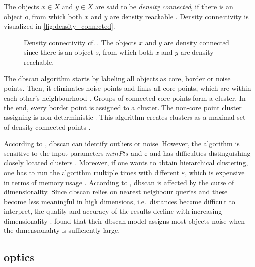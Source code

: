 The objects $x \in X$ and $y \in X$ are said to be \textit{density connected}, if there is an object $o$, from which both $x$ and $y$ are density reachable \cite{OPTICS_kMeans_2016}.
Density connectivity is visualized in \autoref{fig:density_connected}.

\begin{figure}[!htp] %
    \centering
    
    \caption[Density connectivity]{Density connectivity cf. \cite{OPTICS1999}.
    The objects $x$ and $y$ are density connected since there is an object $o$, from which both $x$ and $y$ are density reachable.
    }
    \label{fig:density_connected}
\end{figure}

The \ac{dbscan} algorithm starts by labeling all objects as core, border or noise points.
Then, it eliminates noise points and links all core points, which are within each other's neighbourhood \cite{OPTICS_kMeans_2016}.
Groups of connected core points form a cluster.
In the end, every border point is assigned to a cluster.
The non-core point cluster assigning is non-deterministic \cite{OPTICS2013}.
This algorithm creates clusters as a maximal set of density-connected points \cite{OPTICS_kMeans_2016}.

According to \citeauthor{OPTICS_kMeans_2016}, \ac{dbscan} can identify outliers or noise.
However, the algorithm is sensitive to the input parameters $minPts$ and $\varepsilon$ and has difficulties distinguishing closely located clusters \cite{OPTICS_kMeans_2016}.
Moreover, if one wants to obtain hierarchical clustering, one has to run the algorithm multiple times with different $\varepsilon$, which is expensive in terms of memory usage \cite{OPTICS2013}.
According to \citeauthor{clusteringDocs2020}, \ac{dbscan} is affected by the curse of dimensionality.
Since \ac{dbscan} relies on nearest neighbour queries and these become less meaningful in high dimensions, i.e.\ distances become difficult to interpret, 
the quality and accuracy of the results decline with increasing dimensionality \cite{clusteringDocs2020}.
\citeauthor{clusteringDocs2020} found that their \ac{dbscan} model assigns most objects noise when the dimensionality is sufficiently large.


\subsection{\acs*{optics}}\label{subsec:optics}

